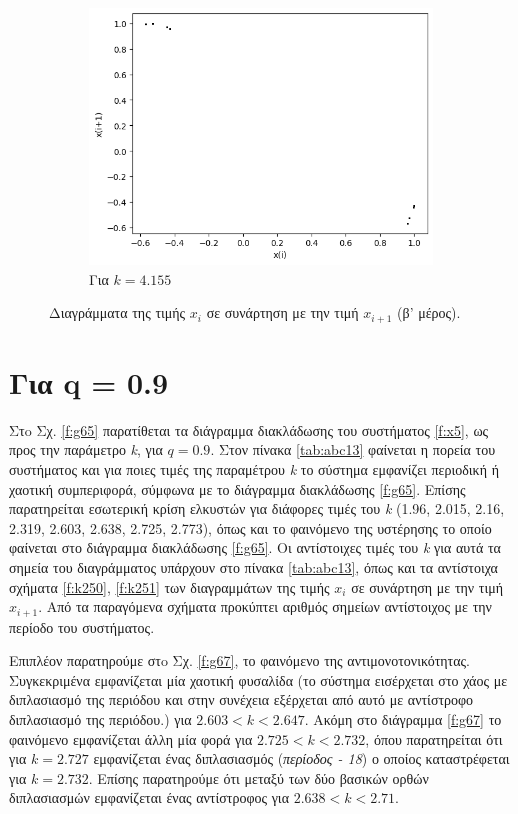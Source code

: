 \begin{figure}[ht]
\begin{subfigure}[b]{0.4\textwidth}
		\includegraphics[width=\textwidth]{LateX images/cheb q=0.8/g14}
		\caption{Για $k=4.155$}
		\label{f:k141}
	\end{subfigure}
	\hfill
	\caption{Διαγράμματα της τιμής \(x_i\) σε συνάρτηση με την τιμή \(x_{i+1}\) (β' μέρος).}
	\label{f:k249}
\end{figure}

\clearpage

\section{Για q = 0.9}

Στo Σχ. \ref{f:g65} παρατίθεται τα διάγραμμα διακλάδωσης του συστήματος \ref{f:x5}, ως προς την παράμετρο \emph{k}, για $q =0.9$. Στον πίνακα \ref{tab:abc13} φαίνεται η πορεία του συστήματος και για ποιες τιμές της παραμέτρου \emph{k} το σύστημα εμφανίζει περιοδική ή χαοτική συμπεριφορά, σύμφωνα με το διάγραμμα διακλάδωσης \ref{f:g65}. Επίσης παρατηρείται εσωτερική κρίση ελκυστών για διάφορες τιμές του \emph{k} (1.96, 2.015, 2.16, 2.319, 2.603, 2.638, 2.725, 2.773), όπως και το φαινόμενο της υστέρησης το οποίο φαίνεται στο διάγραμμα διακλάδωσης \ref{f:g65}. Οι αντίστοιχες τιμές του \emph{k} για αυτά τα σημεία του διαγράμματος υπάρχουν στο πίνακα \ref{tab:abc13}, όπως και τα αντίστοιχα σχήματα \ref{f:k250}, \ref{f:k251} των διαγραμμάτων της τιμής \(x_i\) σε συνάρτηση με την τιμή \(x_{i+1}\). Από τα παραγόμενα σχήματα προκύπτει αριθμός σημείων αντίστοιχος με την περίοδο του συστήματος.

Επιπλέον παρατηρούμε στo Σχ. \ref{f:g67}, το φαινόμενο της αντιμονοτονικότητας. Συγκεκριμένα εμφανίζεται μία χαοτική φυσαλίδα (το σύστημα εισέρχεται στο χάος με διπλασιασμό της περιόδου και στην συνέχεια εξέρχεται από αυτό με αντίστροφο διπλασιασμό της περιόδου.) για $2.603<k<2.647$. Ακόμη στο διάγραμμα \ref{f:g67} το φαινόμενο εμφανίζεται άλλη μία φορά για $2.725<k<2.732$, όπου παρατηρείται ότι για $k=2.727$ εμφανίζεται ένας διπλασιασμός (\emph{περίοδος - 18}) ο οποίος καταστρέφεται για $k=2.732$.
Επίσης παρατηρούμε ότι μεταξύ των δύο βασικών ορθών διπλασιασμών εμφανίζεται ένας αντίστροφος για $2.638<k<2.71$.

